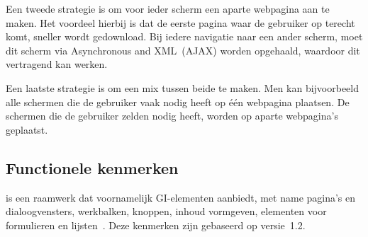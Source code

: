 Een tweede strategie is om voor ieder scherm een aparte webpagina aan te maken. 
Het voordeel hierbij is dat de eerste pagina waar de gebruiker op terecht komt, sneller wordt gedownload. 
Bij iedere navigatie naar een ander scherm, moet dit scherm via Asynchronous \js{} and XML~(AJAX) worden opgehaald, waardoor dit vertragend kan werken. 

Een laatste strategie is om een mix tussen beide te maken. 
Men kan bijvoorbeeld alle schermen die de gebruiker vaak nodig heeft op één webpagina plaatsen. 
De schermen die de gebruiker zelden nodig heeft, worden op aparte webpagina's geplaatst.   

\subsection{Functionele kenmerken}
\jqm{} is een raamwerk dat voornamelijk GI-elementen aanbiedt, met name pagina's en dialoogvensters, werkbalken, knoppen, inhoud vormgeven, elementen voor formulieren en lijsten~\cite{JQuery2012b}.
Deze kenmerken zijn gebaseerd op versie~1.2.

